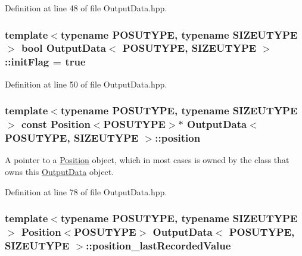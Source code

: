 Definition at line 48 of file Output\-Data.\-hpp.

\hypertarget{struct_output_data_a4b90649aee88b935b5ebf38dee4aff7b}{
\subsubsection[{init\-Flag}]{\setlength{\rightskip}{0pt plus 5cm}template$<$typename P\-O\-S\-U\-T\-Y\-P\-E, typename S\-I\-Z\-E\-U\-T\-Y\-P\-E$>$ bool {\bf Output\-Data}$<$ P\-O\-S\-U\-T\-Y\-P\-E, S\-I\-Z\-E\-U\-T\-Y\-P\-E $>$\-::init\-Flag = true\hspace{0.3cm}{\ttfamily [protected]}}}\label{struct_output_data_a4b90649aee88b935b5ebf38dee4aff7b}


Definition at line 50 of file Output\-Data.\-hpp.

\hypertarget{struct_output_data_a7494156691e440a9a6f2c808321b0cd5}{
\subsubsection[{position}]{\setlength{\rightskip}{0pt plus 5cm}template$<$typename P\-O\-S\-U\-T\-Y\-P\-E, typename S\-I\-Z\-E\-U\-T\-Y\-P\-E$>$ const {\bf Position}$<$P\-O\-S\-U\-T\-Y\-P\-E$>$$\ast$ {\bf Output\-Data}$<$ P\-O\-S\-U\-T\-Y\-P\-E, S\-I\-Z\-E\-U\-T\-Y\-P\-E $>$\-::position\hspace{0.3cm}{\ttfamily [protected]}}}\label{struct_output_data_a7494156691e440a9a6f2c808321b0cd5}


A pointer to a \hyperlink{struct_position}{Position} object, which in most cases is owned by the class that owns this \hyperlink{struct_output_data}{Output\-Data} object. 



Definition at line 78 of file Output\-Data.\-hpp.

\hypertarget{struct_output_data_a21ec70c5ab2418a33e9c6293dd9b588d}{
\subsubsection[{position\-\_\-last\-Recorded\-Value}]{\setlength{\rightskip}{0pt plus 5cm}template$<$typename P\-O\-S\-U\-T\-Y\-P\-E, typename S\-I\-Z\-E\-U\-T\-Y\-P\-E$>$ {\bf Position}$<$P\-O\-S\-U\-T\-Y\-P\-E$>$ {\bf Output\-Data}$<$ P\-O\-S\-U\-T\-Y\-P\-E, S\-I\-Z\-E\-U\-T\-Y\-P\-E $>$\-::position\-\_\-last\-Recorded\-Value\hspace{0.3cm}{\ttfamily [protected]}}}\label{struct_output_data_a21ec70c5ab2418a33e9c6293dd9b588d}


